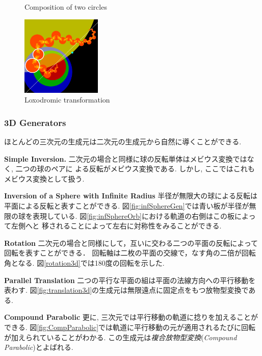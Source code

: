 \begin{figure}[h!tbp]
\begin{minipage}[]{0.75\hsize}
\begin{subfigure}{0.24\textwidth}
 \end{subfigure}
  \hspace*{\fill}
  \caption{Composition of two circles}
 \end{minipage}
 \begin{minipage}[]{0.21\hsize}
  \begin{center}
   \includegraphics[width=1.5in, height=1.5in, keepaspectratio]{../img/klein/2diis/loxodromicEdged.pdf}
   \caption{Loxodromic transformation}
   \label{fig:loxodromic2d}
  \end{center}

 \end{minipage}
\end{figure}

\subsubsection{3D Generators}
ほとんどの三次元の生成元は二次元の生成元から自然に導くことができる.

\noindent\textbf{Simple Inversion.}
二次元の場合と同様に球の反転単体はメビウス変換ではなく, 二つの球のペアに
よる反転がメビウス変換である.
しかし, ここではこれもメビウス変換として扱う.

\noindent\textbf{Inversion of a Sphere with Infinite Radius}
半径が無限大の球による反転は平面による反転と表すことができる.
図\ref{fig:infSphereGen}では青い板が半径が無限の球を表現している.
図\ref{fig:infSphereOrb}における軌道の右側はこの板によって左側へと
移されることによって左右に対称性をみることができる.

\noindent\textbf{Rotation}
二次元の場合と同様にして，互いに交わる二つの平面の反転によって
回転を表すことができる．
回転軸は二枚の平面の交線で，なす角の二倍が回転角となる.
図\ref{rotation3d}では180度の回転を示した.

\noindent\textbf{Parallel Translation}
二つの平行な平面の組は平面の法線方向への平行移動を表わす.
図\ref{fig:translation3d}の生成元は無限遠点に固定点をもつ放物型変換である.

\noindent\textbf{Compound Parabolic}
更に, 三次元では平行移動の軌道に捻りを加えることができる.
図\ref{fig:CompParabolic}では軌道に平行移動の元が適用されるたびに回転
が加えられていることがわかる.
この生成元は\emph{複合放物型変換}(\textit{Compound Parabolic})とよばれる.

